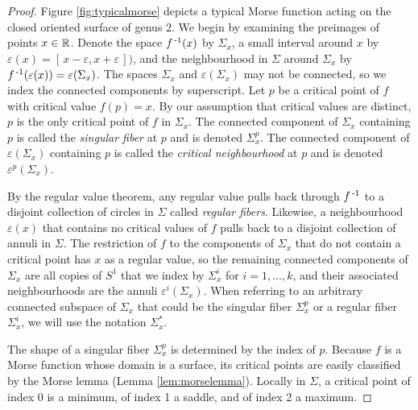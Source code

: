 \begin{proof}
	Figure \ref{fig:typicalmorse} depicts a typical Morse function acting on the closed oriented surface of genus 2.
	We begin by examining the preimages of points $x\in\mathbb{R}$.
	Denote the space $f^{\,\text{-}1}(x)$ by $\Sigma_x$, a small interval around $x$ by $\varepsilon(x)=[\,x-\varepsilon,x+\varepsilon\,])$, and the neighbourhood in $\Sigma$ around $\Sigma_x$ by $f^{\,\text{-}1}(\varepsilon(x))=\varepsilon(\Sigma_x)$.
	The spaces $\Sigma_x$ and $\varepsilon(\Sigma_x)$ may not be connected, so we index the connected components by superscript.
	Let $p$ be a critical point of $f$ with critical value $f(p)=x$.
	By our assumption that critical values are distinct, $p$ is the only critical point of $f$ in $\Sigma_x$.
	The connected component of $\Sigma_x$ containing $p$ is called the \emph{singular fiber} at $p$ and is denoted $\Sigma_x^p$.
	The connected component of $\varepsilon(\Sigma_x)$ containing $p$ is called the \emph{critical neighbourhood} at $p$ and is denoted $\varepsilon^p(\Sigma_x)$.
	
	By the regular value theorem, any regular value pulls back through $f^{\,\text{-}1}$ to a disjoint collection of circles in $\Sigma$ called \emph{regular fibers}.
	Likewise, a neighbourhood $\varepsilon(x)$ that contains no critical values of $f$ pulls back to a disjoint collection of annuli in $\Sigma$.
	The restriction of $f$ to the components of $\Sigma_x$ that do not contain a critical point has $x$ as a regular value, so the remaining connected components of $\Sigma_x$ are all copies of $S^1$ that we index by $\Sigma_x^i$ for $i=1,\dots,k$, and their associated neighbourhoods are the annuli $\varepsilon^i(\Sigma_x)$.
	When referring to an arbitrary connected subspace of $\Sigma_x$ that could be the singular fiber $\Sigma_x^p$ or a regular fiber $\Sigma_x^i$, we will use the notation $\Sigma_x^*$.
	
	The shape of a singular fiber $\Sigma_x^p$ is determined by the index of $p$.
	Because $f$ is a Morse function whose domain is a surface, its critical points are easily classified by the Morse lemma (Lemma \ref{lem:morselemma}).
	Locally in $\Sigma$, a critical point of index 0 is a minimum, of index 1 a saddle, and of index 2 a maximum.
	

\end{proof}

